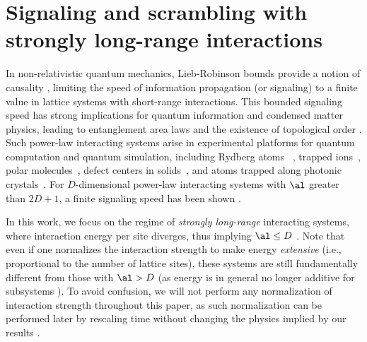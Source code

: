 \chapter{Signaling and scrambling with strongly long-range interactions}
In non-relativistic quantum mechanics, Lieb-Robinson bounds provide a notion of causality \cite{LR}, limiting the speed of information propagation (or signaling) to a finite value in lattice systems with short-range interactions. This bounded signaling speed has strong implications for quantum information and condensed matter physics, leading to entanglement area laws \cite{Hastings07} and the existence of topological order \cite{BravyiHM10}.
Such power-law interacting systems arise in experimental platforms for quantum computation and quantum simulation, including Rydberg atoms ~\cite{Saffman10}, trapped ions~\cite{Britton12}, polar molecules~\cite{Yan13}, defect centers in solids~\cite{Yao12}, and atoms trapped along photonic crystals~\cite{Douglas15}.
For $D$-dimensional power-law interacting systems with $\al$ greater than $2D+1$, a finite signaling speed has been shown \cite{Chen2019,kuwaharaStrictlyLinearLight2020}.


In this work, we focus on the regime of \emph{strongly long-range} interacting systems, where interaction energy per site diverges, thus implying $\al\le D$ \cite{Kastner11,Kastner12, Storch15, Kastner17}.
Note that even if one normalizes the interaction strength to make energy \emph{extensive} (i.e., proportional to the number of lattice sites), these systems are still fundamentally different from those with $\al >D$ (as energy is in general no longer additive for subsystems \cite{Dauxois}).
To avoid confusion, we will not perform any normalization of interaction strength throughout this paper, as such normalization can be performed later by rescaling time  without changing the physics implied by our results \cite{Storch15}.

